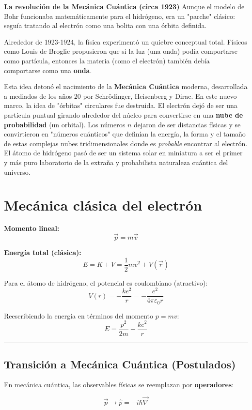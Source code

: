 \documentclass[a4paper]{article}
\begin{document}
\textbf{La revolución de la Mecánica Cuántica (circa 1923)}
Aunque el modelo de Bohr funcionaba matemáticamente para el hidrógeno, era un "parche" clásico: seguía tratando al electrón como una bolita con una órbita definida. 

Alrededor de 1923-1924, la física experimentó un quiebre conceptual total. Físicos como Louis de Broglie propusieron que si la luz (una onda) podía comportarse como partícula, entonces la materia (como el electrón) también debía comportarse como una \textbf{onda}. 

Esta idea detonó el nacimiento de la \textbf{Mecánica Cuántica} moderna, desarrollada a mediados de los años 20 por Schrödinger, Heisenberg y Dirac. En este nuevo marco, la idea de "órbitas" circulares fue destruida. El electrón dejó de ser una partícula puntual girando alrededor del núcleo para convertirse en una \textbf{nube de probabilidad} (un orbital). Los números $n$ dejaron de ser distancias físicas y se convirtieron en "números cuánticos" que definían la energía, la forma y el tamaño de estas complejas nubes tridimensionales donde es \textit{probable} encontrar al electrón. El átomo de hidrógeno pasó de ser un sistema solar en miniatura a ser el primer y más puro laboratorio de la extraña y probabilista naturaleza cuántica del universo.


\section{Mecánica clásica del electrón}

\textbf{Momento lineal:}
\[
\vec{p} = m\vec{v}
\]

\textbf{Energía total (clásica):}
\[
E = K + V = \frac{1}{2}mv^2 + V(\vec{r})
\]

Para el átomo de hidrógeno, el potencial es coulombiano (atractivo):
\[
V(r) = -\frac{ke^2}{r} = -\frac{e^2}{4\pi\varepsilon_0 r}
\]

Reescribiendo la energía en términos del momento $p = mv$:
\[
E = \frac{p^2}{2m} - \frac{ke^2}{r}
\]

\bigskip\hrule\bigskip

\subsection{Transición a Mecánica Cuántica (Postulados)}

En mecánica cuántica, las observables físicas se reemplazan por \textbf{operadores}:

\[
\vec{p} \longrightarrow \hat{p} = -i\hbar\vec{\nabla}
\]
\end{document}
